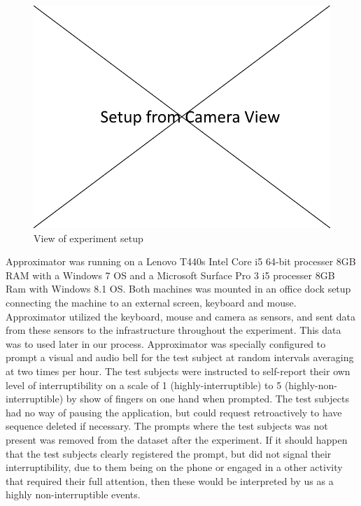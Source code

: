 \documentclass{sigchi}
\begin{document}
\begin{figure}
  \centering
  \includegraphics[width=\columnwidth]{figures/experiment_setup.png}
  \caption{View of experiment setup}
  \label{fig:experiment}
\end{figure}

Approximator was running on a Lenovo T440s Intel Core i5 64-bit processer 8GB RAM with a Windows 7 OS and a Microsoft Surface Pro 3 i5 processer 8GB Ram with Windows 8.1 OS.
Both machines was mounted in an office dock setup connecting the machine to an external screen, keyboard and mouse.
Approximator utilized the keyboard, mouse and camera as sensors, and sent data from these sensors to the infrastructure throughout the experiment.
This data was to used later in our process.
Approximator was specially configured to prompt a visual and audio bell for the test subject at random intervals averaging at two times per hour.
The test subjects were instructed to self-report their own level of interruptibility on a scale of 1 (highly-interruptible) to 5 (highly-non-interruptible) by show of fingers on one hand when prompted.
The test subjects had no way of pausing the application, but could request retroactively to have sequence deleted if necessary.
The prompts where the test subjects was not present was removed from the dataset after the experiment.
If it should happen that the test subjects clearly registered the prompt, but did not signal their interruptibility, due to them being on the phone or engaged in a other activity that required their full attention, then these would be interpreted by us as a highly non-interruptible events.
\end{document}
